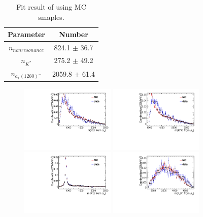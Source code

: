 \begin{table}[!btp]
\centering
\caption{Fit result of \LbLckkpi using MC smaples.}
\vspace{0.2cm}
\label{tab:MassFit_component}
\begin{tabular}{c c }\hline\hline
Parameter         	& Number             \\\hline
$n_{nonresonance}$ & 824.1  $\pm$  36.7 \\
$n_{K^{*}}$        & 275.2  $\pm$  49.2 \\
$n_{a_1(1260)^-}$  & 2059.8 $\pm$  61.4 \\
\hline\hline
\end{tabular}
\end{table}

\begin{figure}[bth]
\centering
\includegraphics[width=0.4\textwidth]{Figures/05_open_charm/04_tune/new_for_note/LbKmPi_M.pdf}%
\includegraphics[width=0.4\textwidth]{Figures/05_open_charm/04_tune/new_for_note/LbKpKm_M.pdf}\\%
\includegraphics[width=0.4\textwidth]{Figures/05_open_charm/04_tune/new_for_note/LbKpPi_M.pdf}%
\includegraphics[width=0.4\textwidth]{Figures/05_open_charm/04_tune/new_for_note/LcLbKp_M_con.pdf}\\

\end{figure}
